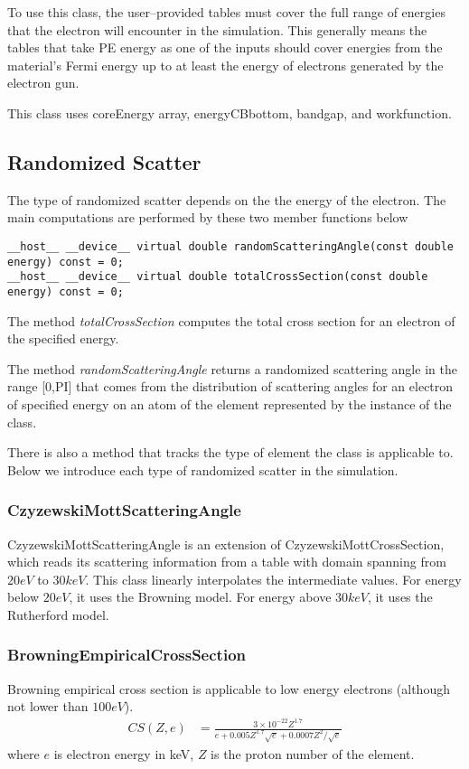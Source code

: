To use this class, the user--provided tables must cover the full range of energies that the electron will encounter in the simulation. This generally means the tables that take PE energy as one of the inputs should cover energies from the material's Fermi energy up to at least the energy of electrons generated by the electron gun.

This class uses coreEnergy array, energyCBbottom, bandgap, and workfunction.

\subsection{Randomized Scatter}
The type of randomized scatter depends on the the energy of the electron. The main computations are performed by these two member functions below

\begin{lstlisting}
__host__ __device__ virtual double randomScatteringAngle(const double energy) const = 0;
__host__ __device__ virtual double totalCrossSection(const double energy) const = 0;
\end{lstlisting}

The method \textit{totalCrossSection} computes the total cross section for an electron of the specified energy.

The method \textit{randomScatteringAngle} returns a randomized scattering angle in the range [0,PI] that comes from the distribution of scattering angles for an electron of specified energy on an atom of the element represented by the instance of the class.

There is also a method that tracks the type of element the class is applicable to. Below we introduce each type of randomized scatter in the simulation.

\subsubsection{CzyzewskiMottScatteringAngle}
CzyzewskiMottScatteringAngle is an extension of CzyzewskiMottCrossSection, which reads its scattering information from a table with domain spanning from $20 eV$ to $30 keV$. This class linearly interpolates the intermediate values. For energy below $20 eV$, it uses the Browning model. For energy above $30 keV$, it uses the Rutherford model.

\subsubsection{BrowningEmpiricalCrossSection}
Browning empirical cross section is applicable to low energy electrons (although not lower than $100eV$). 
\begin{align*}
   CS(Z, e) &= \frac{3\times 10^{-22} Z^{1.7}}{e + 0.005 Z^{1.7} \sqrt{e} + 0.0007 Z^{2} / \sqrt{e}}
\end{align*}
where $e$ is electron energy in keV, $Z$ is the proton number of the element.

